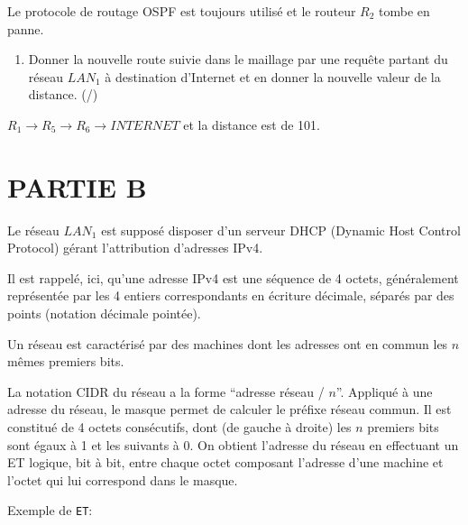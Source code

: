 



\medskip
\pagebreak

    Le protocole de routage OSPF est toujours utilisé et le routeur $R_2$ tombe en panne.

    

    \begin{enumerate}[resume=monDS]
    \item Donner la nouvelle route suivie dans le maillage par une requête partant du réseau $LAN_1$ à destination d'Internet et en donner la nouvelle valeur de la distance.   (/)
    \end{enumerate}
    \begin{blocvisiblex}[height=1]
        {}
        $R_1 \rightarrow R_5 \rightarrow R_6 \rightarrow INTERNET$ et la distance est de 101.
    \end{blocvisiblex}
    
\section*{PARTIE B}

Le réseau $LAN_1$ est supposé disposer d'un serveur DHCP (Dynamic Host Control Protocol) gérant l'attribution d'adresses IPv4. 

Il est rappelé, ici, qu'une adresse IPv4 est une séquence de 4 octets, généralement représentée par les 4 entiers correspondants en écriture décimale, séparés par des points (notation décimale pointée). 

Un réseau est caractérisé par des machines dont les adresses ont en commun les $n$ mêmes premiers bits. 

La notation CIDR du réseau a la forme “adresse réseau / $n$”. Appliqué à une adresse du réseau, le masque permet de calculer le préfixe réseau commun. Il est constitué de 4 octets consécutifs, dont (de gauche à droite) les $n$ premiers bits sont égaux à 1 et les suivants à 0. On obtient l'adresse du réseau en effectuant un ET logique, bit à bit, entre chaque octet composant l'adresse d'une machine et l'octet qui lui correspond dans le masque.
 
\medskip

Exemple de \texttt{ET}:

